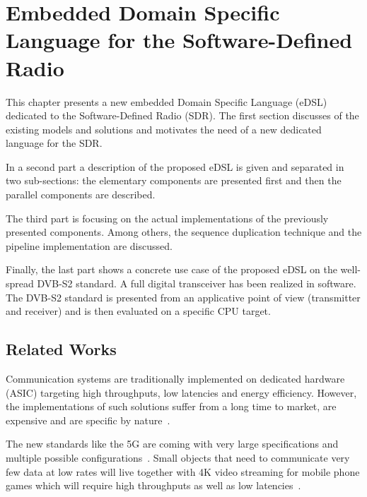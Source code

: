 
\graphicspath{{main/chapter6/fig/}}

\chapter{Embedded Domain Specific Language for the Software-Defined Radio}
\label{chap:sdr}

This chapter presents a new embedded Domain Specific Language (eDSL) dedicated
to the Software-Defined Radio (SDR). The first section discusses of the existing
models and solutions and motivates the need of a new dedicated language for the
SDR.

In a second part a description of the proposed eDSL is given and separated in
two sub-sections: the elementary components are presented first and then the
parallel components are described.

The third part is focusing on the actual implementations of the previously
presented components. Among others, the sequence duplication technique and the
pipeline implementation are discussed.

Finally, the last part shows a concrete use case of the proposed eDSL on the
well-spread DVB-S2 standard. A full digital transceiver has been realized in
software. The DVB-S2 standard is presented from an applicative point of view
(transmitter and receiver) and is then evaluated on a specific CPU target.

\vspace*{\fill}
\minitoccustom
\vspace*{\fill}

\section{Related Works}

Communication systems are traditionally implemented on dedicated hardware
(ASIC) targeting high throughputs, low latencies and energy efficiency.
However, the implementations of such solutions suffer from a long time to
market, are expensive and are specific by nature~\cite{Palkovic2010,
Palkovic2012}.

The new standards like the 5G are coming with very large specifications and
multiple possible configurations~\cite{ETSI2018}. Small objects that need to
communicate very few data at low rates will live together with 4K video
streaming for mobile phone games which will require high throughputs as well as
low latencies~\cite{Rost2014}.

